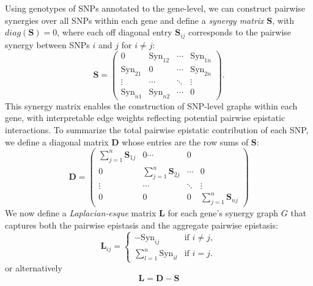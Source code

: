 \documentclass{article}\usepackage[]{graphicx}\usepackage[]{color}
\begin{document}
\par
Using genotypes of SNPs annotated to the gene-level, we can construct pairwise synergies over all SNPs within each gene and define a \textit{synergy matrix} $\mathbf{S}$, with $diag(\mathbf{S}) = 0$, where each off diagonal entry $\mathbf{S}_{ij}$ corresponds to the pairwise synergy between SNPs $i$ and $j$ for $i\ne j$:
\begin{equation}
\mathbf{S} = \begin{pmatrix}
0 & \text{Syn}_{12} & \cdots & \text{Syn}_{1n}\\
\text{Syn}_{21} & 0 & \cdots & \text{Syn}_{2n}\\
\vdots & \cdots & \ddots & \vdots\\
\text{Syn}_{n1} & \text{Syn}_{n2} & \cdots & 0
\end{pmatrix}.
\label{eq:S}
\end{equation}
This synergy matrix enables the construction of SNP-level graphs within each gene, with interpretable edge weights reflecting potential pairwise epistatic interactions. To summarize the total pairwise epistatic contribution of each SNP, we define a diagonal matrix $\mathbf{D}$ whose entries are the row sums of $\mathbf{S}$:
\begin{equation}
\mathbf{D} = \begin{pmatrix}
\sum_{j=1}^n \mathbf{S}_{1j} & 0 \cdots & 0 \\
0 & \sum_{j=1}^n \mathbf{S}_{2j} & \cdots & 0\\
\vdots & \cdots & \ddots & \vdots \\
0 & 0 & 0 & \sum_{j=1}^n \mathbf{S}_{nj}
\end{pmatrix}
\label{eq:D}
\end{equation}
We now define a \textit{Laplacian-esque} matrix $\mathbf{L}$ for each gene's synergy graph $G$ that captures both the pairwise epistasis and the aggregate pairwise epistasis: 
$$\mathbf{L}_{ij} =
\begin{cases}
-\text{Syn}_{ij} & \text{if } i \ne j, \\
\sum_{l=1}^n\text{Syn}_{il} & \text{if } i = j.
\end{cases}
$$ or alternatively
\begin{equation}
\mathbf{L} = \mathbf{D} - \mathbf{S}
\label{eq:L}
\end{equation}
\end{document}
